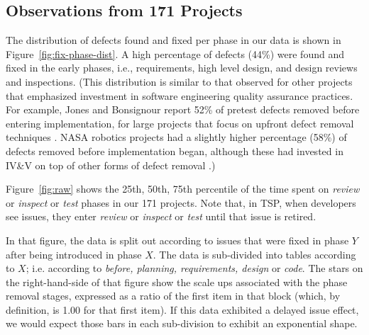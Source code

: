 \documentclass[smallcondesed]{svjour3}
\newcommand{\fig}[1]{Figure~\ref{fig:#1}}
\begin{document}
\newpage
\subsection{Observations from 171 Projects}

The distribution of defects found and fixed per phase in our data is shown in Figure~\ref{fig:fix-phase-dist}. A high percentage of defects (44\%) were found and fixed in the early phases, i.e., requirements, high level design, and design reviews and inspections. (This distribution is similar to that observed for other projects that emphasized investment in software engineering quality assurance practices. For example, Jones and Bonsignour report 52\% of pretest defects removed before entering implementation, for large projects that focus on upfront defect removal techniques \cite{jones12}. NASA robotics projects had a slightly higher percentage (58\%) of defects removed before implementation began, although these had invested in IV\&V on top of other forms of defect removal \cite{me08a}.)  

\fig{raw} shows the 25th, 50th, 75th percentile
of the time spent on {\em review} or {\em inspect} or {\em test} phases
in our 171 projects.
Note that, in TSP, when developers see issues, they enter {\em review} or 
{\em inspect} or {\em test}
until that issue is retired.

In that figure, the data is split out according to issues that were fixed in phase $Y$ after
being introduced in phase $X$. The data is sub-divided into tables according to $X$;
i.e. according to {\em before, planning, requirements, design} or {\em  code}. 
The stars on the right-hand-side of that figure show the scale ups associated with the phase removal stages,
expressed as a ratio of the first item in that block (which, by definition, is 1.00 for
that first item).
If  this data exhibited a delayed issue effect,  we would expect those bars in each sub-division to exhibit an
exponential shape.
\end{document}
